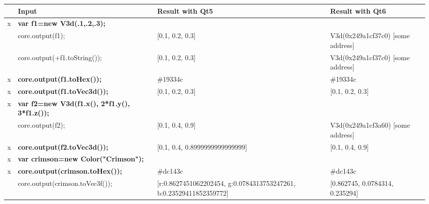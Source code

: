 \begin{table}
{\ttfamily\scriptsize
\begin{tabular}{rlll}
 &Input                                         & Result with Qt5                                                       & Result with Qt6                          \\\hline
x&\textbf{var f1=new V3d(.1,.2,.3);}            &                                                                       &                                          \\
 &core.output(f1);                              &  [0.1, 0.2, 0.3]                                                      &  V3d(0x249a1cf37c0) [some address]       \\
 &core.output(+f1.toString());                  &  [0.1, 0.2, 0.3]                                                      &  V3d(0x249a1cf37c0) [some address]       \\
x&\textbf{core.output(f1.toHex());}             &  \#19334c                                                             &  \#19334c                                \\
x&\textbf{core.output(f1.toVec3d());}           &  [0.1, 0.2, 0.3]                                                      &  [0.1, 0.2, 0.3]                         \\\hline
x&\textbf{var f2=new V3d(f1.x(), 2*f1.y(), 3*f1.z());}   &                                                              &                                          \\
 &core.output(f2);                              &  [0.1, 0.4, 0.9]                                                      &  V3d(0x249a1cf3a60) [some address]       \\
x&\textbf{core.output(f2.toVec3d());}           &  [0.1, 0.4, 0.8999999999999999]                                       &  [0.1, 0.4, 0.9]                         \\\hline
x&\textbf{var crimson=new Color("Crimson");}    &                                                              &                                          \\
x&\textbf{core.output(crimson.toHex());}        &  \#dc143c                                                             &  \#dc143c                                \\
 &core.output(crimson.toVec3f());               &  [r:0.8627451062202454, g:0.0784313753247261, b:0.23529411852359772]  &  [0.862745, 0.0784314, 0.235294]         \\

\end{tabular}}
\end{table}
